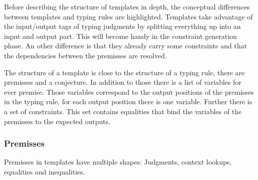 Before describing the structure of templates in depth, the conceptual
differences between templates and typing rules are highlighted.
Templates take advantage of the input/output tags of typing judgments
by splitting everything up into an input and output part. This will
become handy in the constraint generation phase. An other difference
is that they already carry some constraints and that the dependencies
between the premisses are resolved.

The structure of a template is close to the structure of a typing
rule, there are premisses and a conjecture. In addition to those there
is a list of variables for ever premise. Those variables correspond to
the output positions of the premisses in the typing rule, for each
output position there is one variable. Further there is a set of
constraints. This set contains equalities that bind the variables of
the premisses to the expected outputs.

\subsubsection*{Premisses}
Premisses in templates have multiple shapes: Judgments, context
lookups, equalities and inequalities.

